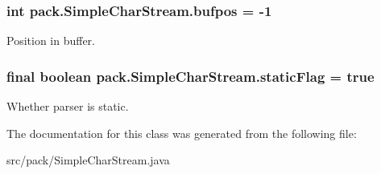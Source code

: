 \subsubsection[{\texorpdfstring{bufpos}{bufpos}}]{\setlength{\rightskip}{0pt plus 5cm}int pack.\+Simple\+Char\+Stream.\+bufpos = -\/1\hspace{0.3cm}{\ttfamily [static]}}\hypertarget{classpack_1_1_simple_char_stream_a5fee3a4d5f641687f0236f9471cdf337}{}\label{classpack_1_1_simple_char_stream_a5fee3a4d5f641687f0236f9471cdf337}
Position in buffer. 
\subsubsection[{\texorpdfstring{static\+Flag}{staticFlag}}]{\setlength{\rightskip}{0pt plus 5cm}final boolean pack.\+Simple\+Char\+Stream.\+static\+Flag = true\hspace{0.3cm}{\ttfamily [static]}}\hypertarget{classpack_1_1_simple_char_stream_a57e32aa1c2ba0aabf1c48108f5bd1cc8}{}\label{classpack_1_1_simple_char_stream_a57e32aa1c2ba0aabf1c48108f5bd1cc8}
Whether parser is static. 

The documentation for this class was generated from the following file\+:\begin{DoxyCompactItemize}
\item 
src/pack/Simple\+Char\+Stream.\+java\end{DoxyCompactItemize}
